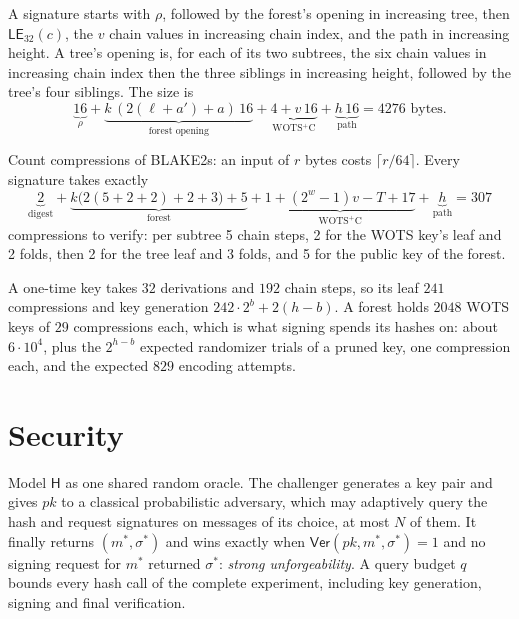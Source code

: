\documentclass[11pt]{article}
\theoremstyle{plain}
\theoremstyle{definition}
\newcommand{\Ver}{\mathsf{Ver}}
\newcommand{\hash}{\mathsf{H}}
\newcommand{\LE}{\mathsf{LE}}
\newcommand{\pk}{\mathit{pk}}
\begin{document}
A signature starts with $\rho$, followed by the forest's opening in increasing tree, then $\LE_{32}(c)$, the $v$ chain values in increasing chain index, and the path in increasing height. A tree's opening is, for each of its two subtrees, the six chain values in increasing chain index then the three siblings in increasing height, followed by the tree's four siblings. The size is
\[
  \underbrace{16}_{\rho}
  +\underbrace{k\,(2(\ell+a')+a)\,16}_{\text{forest opening}}
  +\underbrace{4+v\,16}_{\text{WOTS$^+$C}}
  +\underbrace{h\,16}_{\text{path}}
  =4276\text{ bytes}.
\]

Count compressions of BLAKE2s: an input of $r$ bytes costs $\lceil r/64\rceil$. Every signature takes exactly
\[
  \underbrace{2}_{\text{digest}}
  +\underbrace{k\bigl(2(5+2+2)+2+3\bigr)+5}_{\text{forest}}
  +\underbrace{1+(2^w-1)v-T+17}_{\text{WOTS$^+$C}}
  +\underbrace{h}_{\text{path}}
  =307
\]
compressions to verify: per subtree 5 chain steps, 2 for the WOTS key's leaf and 2 folds, then 2 for the tree leaf and 3 folds, and 5 for the public key of the forest.

A one-time key takes $32$ derivations and $192$ chain steps, so its leaf $241$ compressions and key generation $242\cdot2^b+2(h-b)$. A forest holds $2048$ WOTS keys of $29$ compressions each, which is what signing spends its hashes on: about $6\cdot10^4$, plus the $2^{h-b}$ expected randomizer trials of a pruned key, one compression each, and the expected $829$ encoding attempts.

\section{Security}
\label{sec:security}

Model $\hash$ as one shared random oracle. The challenger generates a key pair and gives $\pk$ to a classical probabilistic adversary, which may adaptively query the hash and request signatures on messages of its choice, at most $N$ of them. It finally returns $(m^*,\sigma^*)$ and wins exactly when $\Ver(\pk,m^*,\sigma^*)=1$ and no signing request for $m^*$ returned $\sigma^*$: \emph{strong unforgeability}. A query budget $q$ bounds every hash call of the complete experiment, including key generation, signing and final verification.
\end{document}
